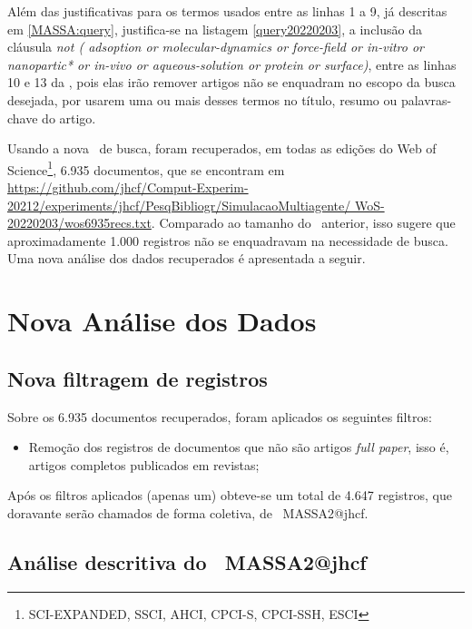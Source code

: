 Além das justificativas para os termos usados entre as linhas 1 a 9, já descritas em \ref{MASSA:query},  justifica-se na listagem \ref{query20220203}, a inclusão da cláusula \textit{not (
 adsoption or molecular-dynamics or force-field
 or in-vitro or nanopartic* or in-vivo
 or aqueous-solution or protein or surface)}, entre as linhas 10 e 13 da \query, pois elas irão remover artigos não se enquadram no escopo da busca desejada, por usarem uma ou mais desses termos no título, resumo ou palavras-chave do artigo.
 
Usando a nova \query\ de busca, foram recuperados, em todas as edições do Web of Science\footnote{SCI-EXPANDED, SSCI, AHCI, CPCI-S, CPCI-SSH, ESCI}, 6.935 documentos, que se encontram em
\url{https://github.com/jhcf/Comput-Experim-20212/experiments/jhcf/PesqBibliogr/SimulacaoMultiagente/ WoS-20220203/wos6935recs.txt}. Comparado ao tamanho do \dataset\ anterior, isso sugere que aproximadamente 1.000 registros não se enquadravam na necessidade de busca.
Uma nova análise dos dados recuperados é apresentada a seguir.

\section{Nova Análise dos Dados}

\subsection{Nova filtragem de registros}

Sobre os 6.935 documentos recuperados, foram  aplicados os seguintes filtros:
\begin{itemize}
    \item Remoção dos registros de documentos que não são artigos \textit{full paper}, isso é, artigos completos publicados em revistas;
\end{itemize}

Após os filtros aplicados (apenas um)  obteve-se um total de 4.647 registros, que doravante serão chamados de forma coletiva, de \dataset\   MASSA2@jhcf.

\subsection{Análise descritiva do \dataset\   MASSA2@jhcf}

